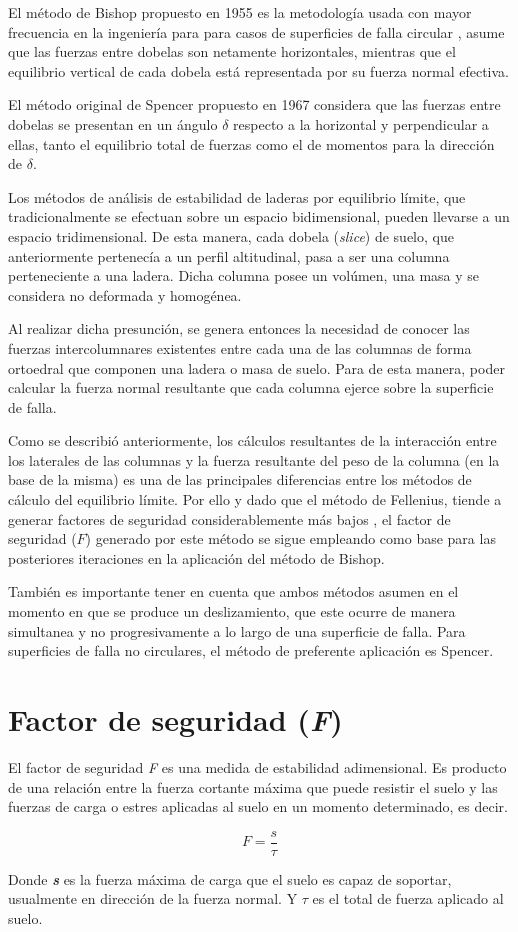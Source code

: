 El m\'etodo de Bishop propuesto en 1955 es la metodolog\'ia usada con mayor frecuencia en la ingenier\'ia para para casos de superficies de falla circular \cite{huangB}, asume que las fuerzas entre dobelas son netamente horizontales, mientras que el equilibrio vertical de cada dobela est\'a representada por su fuerza normal efectiva.

El m\'etodo original de Spencer propuesto en 1967 \cite{spencer1967method} considera que las fuerzas entre dobelas se presentan en un \'angulo $\delta$ respecto a la horizontal y perpendicular a ellas, tanto el equilibrio total de fuerzas como el de momentos para la direcci\'on de $\delta$. 

Los m\'etodos de an\'alisis de estabilidad de laderas por equilibrio l\'imite, que tradicionalmente se efectuan sobre un espacio bidimensional, pueden llevarse a un espacio tridimensional. 
De esta manera, cada dobela (\textit{slice}) de suelo, que anteriormente pertenec\'ia a un perfil altitudinal, pasa a ser una columna perteneciente a una ladera. Dicha columna posee un vol\'umen, una masa y se considera no deformada y homog\'enea. \cite{huang2000new}

Al realizar dicha presunci\'on, se genera entonces la necesidad de conocer las fuerzas intercolumnares existentes entre cada una de las columnas de forma ortoedral que componen una ladera o masa de suelo. Para de esta manera, poder calcular la fuerza normal resultante que cada columna ejerce sobre la superficie de falla.\cite{reid2015scoops3d}

Como se describi\'o anteriormente, los c\'alculos resultantes de la interacci\'on entre los laterales de las columnas y la fuerza resultante del peso de la columna (en la base de la misma) es una de las principales diferencias entre los m\'etodos de c\'alculo del equilibrio l\'imite. Por ello y dado que el m\'etodo de Fellenius, tiende a generar factores de seguridad considerablemente m\'as bajos \cite{traditional}, el factor de seguridad (\(F\)) generado por este m\'etodo se sigue empleando como base para las posteriores iteraciones en la aplicaci\'on del m\'etodo de Bishop. \cite{fredlund1977comparison}

Tambi\'en es importante tener en cuenta que ambos m\'etodos asumen en el momento en que se produce un deslizamiento, que este ocurre de manera simultanea y no progresivamente a lo largo de una superficie de falla.
Para superficies de falla no circulares, el m\'etodo de preferente aplicaci\'on es Spencer.  \cite{huangS} 

\section{Factor de seguridad (\textit{F})}
El factor de seguridad \textit{F} es una medida de estabilidad adimensional. Es producto de una relaci\'on entre la fuerza cortante m\'axima que puede resistir el suelo y las fuerzas de carga o estres aplicadas al suelo en un momento determinado, es decir.


$$F =\frac{\textit{s}}{\tau}$$

Donde \textbf{\textit{s}} es la fuerza m\'axima de carga que el suelo es capaz de soportar, usualmente en direcci\'on de la fuerza normal. Y $\tau$ es el total de fuerza aplicado al suelo.